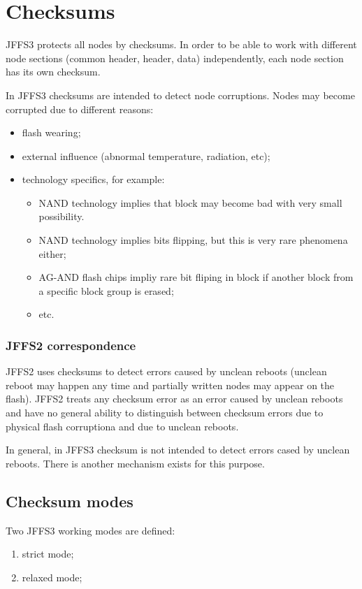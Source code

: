 \documentclass[12pt,a4paper,twoside,titlepage]{article}
\begin{document}
%
%
\thispagestyle{empty}
\tableofcontents
\newpage

%
%
\section{Checksums}
JFFS3 protects all nodes by checksums.
In order to be able to work with different node sections (common header,
header, data) independently, each node section has its own checksum.

In JFFS3 checksums are intended to detect node corruptions. Nodes may
become corrupted due to different reasons:
\begin{itemize}
\item flash wearing;
\item external influence (abnormal temperature, radiation, etc);
\item technology specifics, for example:
\begin{itemize}
\item NAND technology implies that block may become bad with very small
possibility.
\item NAND technology implies bits flipping, but this is very rare
phenomena either;
\item AG-AND flash chips impliy rare bit fliping in block if another block
from a specific block group is erased;
\item etc.
\end{itemize}
\end{itemize}

\subsubsection*{JFFS2 correspondence}
JFFS2 uses checksums to detect errors caused by unclean reboots (unclean
reboot may happen any time and partially written nodes may
appear on the flash). JFFS2 treats any checksum error as an error caused by
unclean reboots and have no general ability to distinguish between
checksum errors due to physical flash corruptiona and due to unclean
reboots.

In general, in JFFS3 checksum is not intended to detect errors cased by unclean
reboots. There is another mechanism exists for this purpose. 

\subsection{Checksum modes}
Two JFFS3 working modes are defined:
\begin{enumerate}
\item strict mode;
\item relaxed mode;
\end{enumerate}
\end{document}
